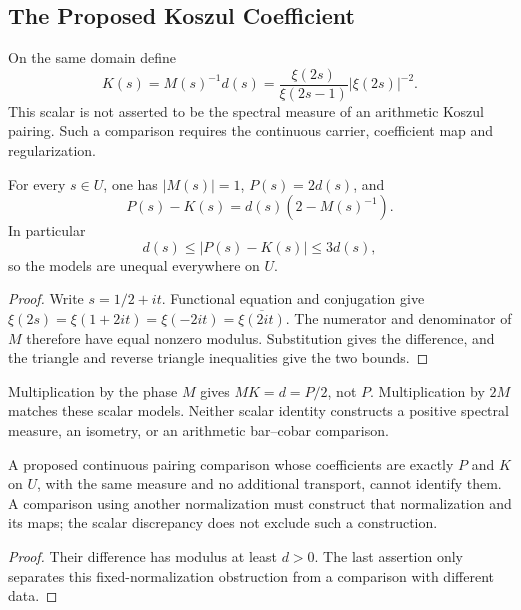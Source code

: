 \subsection{The Proposed Koszul Coefficient}
\label{v4-arith:kms-gns:cycle4:koszul-continuation}
\begin{definition}
\label{v4-arith:kms-gns:lem:Koszul-continued}
On the same domain define
\begin{equation}
\label{v4-arith:kms-gns:eq:Koszul-continued}
 K(s)=M(s)^{-1}d(s)
 =\frac{\xi(2s)}{\xi(2s-1)}|\xi(2s)|^{-2}.
\end{equation}
This scalar is not asserted to be the spectral measure of an
arithmetic Koszul pairing. Such a comparison requires the
continuous carrier, coefficient map and regularization.
\end{definition}

\begin{theorem}
\label{v4-arith:kms-gns:thm:eisenstein-discrepancy}
For every \(s\in U\), one has \(|M(s)|=1\), \(P(s)=2d(s)\), and
\begin{equation}
\label{v4-arith:kms-gns:eq:continuum-discrepancy}
 P(s)-K(s)=d(s)(2-M(s)^{-1}).
\end{equation}
In particular
\begin{equation}
\label{v4-arith:kms-gns:eq:continuum-match-condition}
 d(s)\leq |P(s)-K(s)|\leq3d(s),
\end{equation}
so the models are unequal everywhere on \(U\).
\end{theorem}
\begin{proof}
Write \(s=1/2+it\). Functional equation and conjugation give
\(\xi(2s)=\xi(1+2it)=\xi(-2it)=\overline{\xi(2it)}\).
The numerator and denominator of \(M\) therefore have equal
nonzero modulus. Substitution gives the difference, and the
triangle and reverse triangle inequalities give the two bounds.
\end{proof}

\begin{remark}
\label{v4-arith:kms-gns:rem:match-is-FE}
Multiplication by the phase \(M\) gives \(MK=d=P/2\), not \(P\).
Multiplication by \(2M\) matches these scalar models. Neither
scalar identity constructs a positive spectral measure, an
isometry, or an arithmetic bar--cobar comparison.
\end{remark}

\begin{corollary}
\label{v4-arith:kms-gns:cor:eisenstein-final}
A proposed continuous pairing comparison whose coefficients are
exactly \(P\) and \(K\) on \(U\), with the same measure and no
additional transport, cannot identify them. A comparison using
another normalization must construct that normalization and its
maps; the scalar discrepancy does not exclude such a construction.
\end{corollary}
\begin{proof}
Their difference has modulus at least \(d>0\). The last assertion
only separates this fixed-normalization obstruction from a
comparison with different data.
\end{proof}

